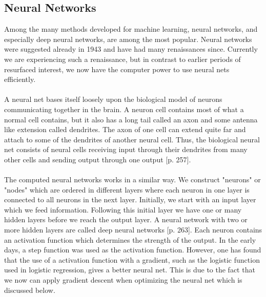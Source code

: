 %
%
%
%
%
%
%
\subsection{Neural Networks}
Among the many methods developed for machine learning, neural networks, and especially deep neural networks, are among the most popular. Neural networks were suggested already in 1943 \cite{McCulloch1943} and have had many renaissances since. Currently we are experiencing such a renaissance, but in contrast to earlier periods of resurfaced interest, we now have the computer power to use neural nets efficiently. \\ \\
A neural net bases itself loosely upon the biological model of neurons communicating together in the brain. A neuron cell contains most of what a normal cell contains, but it also has a long tail called an axon and some antenna like extension called dendrites. The axon of one cell can extend quite far and attach to some of the dendrites of another neural cell. Thus, the biological neural net consists of neural cells receiving input through their dendrites from many other cells and sending output through one output \cite{Geron}[p. 257]. \\ \\
The computed neural networks works in a similar way. We construct "neurons" or "nodes" which are ordered in different layers where each neuron in one layer is connected to all neurons in the next layer. Initially, we start with an input layer which we feed information. Following this initial layer we have one or many hidden layers before we reach the output layer. A neural network with two or more hidden layers are called deep neural networks \cite{Geron}[p. 263]. Each neuron contains an activation function which determines the strength of the output. In the early days, a step function was used as the activation function. However, one has found that the use of a activation function with a gradient, such as the logistic function used in logistic regression, gives a better neural net. This is due to the fact that we now can apply gradient descent when optimizing the neural net which is discussed below. \\ \\
